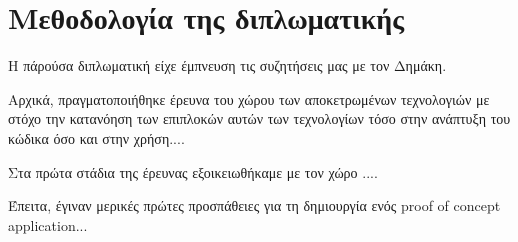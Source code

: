\section{Μεθοδολογία της διπλωματικής}

Η πάρούσα διπλωματική είχε έμπνευση τις συζητήσεις μας με τον Δημάκη.

Αρχικά, πραγματοποιήθηκε έρευνα του χώρου των αποκετρωμένων τεχνολογιών με στόχο την κατανόηση των επιπλοκών αυτών των τεχνολογίων τόσο στην ανάπτυξη του κώδικα όσο και στην χρήση....

Στα πρώτα στάδια της έρευνας εξοικειωθήκαμε με τον χώρο ....

Έπειτα, έγιναν μερικές πρώτες προσπάθειες για τη δημιουργία ενός proof of concept application...
